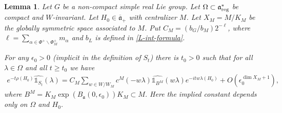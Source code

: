 \documentclass[12pt]{amsart}
\newtheorem{lemma}[theorem]{Lemma}
\theoremstyle{remark}
\newcommand{\ga}{\mathfrak a}
\begin{document}
\begin{lemma}\label{lemma:expansion}
Let $G$ be a non-compact simple real Lie group. Let $\Omega\subset\ga_{\rm reg}^*$ be compact and $W$-invariant. Let $H_0\in\overline{\ga}_+$ with centralizer $M$.  Let $X_M = M/K_M$ be the globally symmetric space associated to $M$.  Put $C_M = (b_G/b_M) 2^{-\ell}$, where $\ell = \sum_{\alpha \in \Phi^+ \smallsetminus \Phi_M^+} m_\alpha$ and $b_L$ is defined in \eqref{L-int-formula}. 

For any $\epsilon_0>0$ (implicit in the definition of $S_t$) there is $t_0> 0$ such that for all $\lambda \in \Omega$ and all $t\geq t_0$ we have
    \begin{gather*}
e^{-t \rho(H_0)} \widehat{\mathds{1}_{S_t}}(\lambda) = C_M \sum_{w \in W / W_M }c^M( - w\lambda)\widehat{\mathds{1}_{B^M}}(w\lambda)   e^{-itw\lambda( H_0)} +O( \epsilon_0^{ \dim X_M + 1} ),
    \end{gather*} 
 where $B^M=K_M\exp(B_\ga(0,\epsilon_0))K_M \subset M$.  Here the implied constant depends only on $\Omega$ and $H_0$.
 
\end{lemma}
\end{document}
